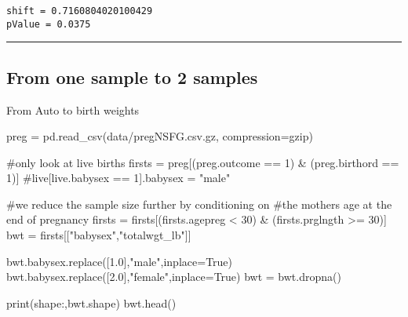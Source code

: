 \documentclass[
  letterpaper,
  DIV=11,
  numbers=noendperiod]{scrreprt}
\newenvironment{Shaded}{\begin{snugshade}}{\end{snugshade}}
\newcommand{\BuiltInTok}[1]{\textcolor[rgb]{0.00,0.23,0.31}{#1}}
\newcommand{\CommentTok}[1]{\textcolor[rgb]{0.37,0.37,0.37}{#1}}
\newcommand{\DecValTok}[1]{\textcolor[rgb]{0.68,0.00,0.00}{#1}}
\newcommand{\FloatTok}[1]{\textcolor[rgb]{0.68,0.00,0.00}{#1}}
\newcommand{\NormalTok}[1]{\textcolor[rgb]{0.00,0.23,0.31}{#1}}
\newcommand{\OperatorTok}[1]{\textcolor[rgb]{0.37,0.37,0.37}{#1}}
\newcommand{\StringTok}[1]{\textcolor[rgb]{0.13,0.47,0.30}{#1}}
\newcommand{\VariableTok}[1]{\textcolor[rgb]{0.07,0.07,0.07}{#1}}
\begin{document}
\begin{verbatim}
shift = 0.7160804020100429
pValue = 0.0375
\end{verbatim}

\begin{center}\rule{0.5\linewidth}{0.5pt}\end{center}

\hypertarget{from-one-sample-to-2-samples}{%
\subsection{From one sample to 2
samples}\label{from-one-sample-to-2-samples}}

From Auto to birth weights

\begin{Shaded}
\begin{Highlighting}[]
\NormalTok{preg }\OperatorTok{=}\NormalTok{ pd.read\_csv(}\StringTok{\textquotesingle{}data/pregNSFG.csv.gz\textquotesingle{}}\NormalTok{, compression}\OperatorTok{=}\StringTok{\textquotesingle{}gzip\textquotesingle{}}\NormalTok{)}

\CommentTok{\#only look at live births}
\NormalTok{firsts }\OperatorTok{=}\NormalTok{ preg[(preg.outcome }\OperatorTok{==} \DecValTok{1}\NormalTok{) }\OperatorTok{\&}\NormalTok{ (preg.birthord }\OperatorTok{==} \DecValTok{1}\NormalTok{)]}
\CommentTok{\#live[live.babysex == 1].babysex = "male"}

\CommentTok{\#we reduce the sample size further by conditioning on }
\CommentTok{\#the mother\textquotesingle{}s age at the end of pregnancy}
\NormalTok{firsts }\OperatorTok{=}\NormalTok{ firsts[(firsts.agepreg }\OperatorTok{\textless{}} \DecValTok{30}\NormalTok{) }\OperatorTok{\&}\NormalTok{ (firsts.prglngth }\OperatorTok{\textgreater{}=} \DecValTok{30}\NormalTok{)]}
\NormalTok{bwt }\OperatorTok{=}\NormalTok{ firsts[[}\StringTok{"babysex"}\NormalTok{,}\StringTok{"totalwgt\_lb"}\NormalTok{]] }

\NormalTok{bwt.babysex.replace([}\FloatTok{1.0}\NormalTok{],}\StringTok{"male"}\NormalTok{,inplace}\OperatorTok{=}\VariableTok{True}\NormalTok{)}
\NormalTok{bwt.babysex.replace([}\FloatTok{2.0}\NormalTok{],}\StringTok{"female"}\NormalTok{,inplace}\OperatorTok{=}\VariableTok{True}\NormalTok{)}
\NormalTok{bwt }\OperatorTok{=}\NormalTok{ bwt.dropna()}
\end{Highlighting}
\end{Shaded}

\begin{Shaded}
\begin{Highlighting}[]
\BuiltInTok{print}\NormalTok{(}\StringTok{\textquotesingle{}shape:\textquotesingle{}}\NormalTok{,bwt.shape)}
\NormalTok{bwt.head()}
\end{Highlighting}
\end{Shaded}
\end{document}

